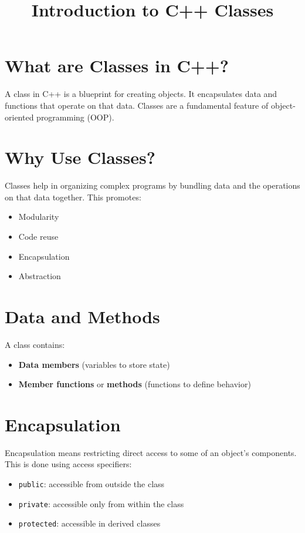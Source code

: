 \documentclass{article}
\title{Introduction to C++ Classes}
\author{}
\date{}
\begin{document}
\maketitle

\section{What are Classes in C++?}
A class in C++ is a blueprint for creating objects. It encapsulates data and functions that operate on that data. Classes are a fundamental feature of object-oriented programming (OOP).

\section{Why Use Classes?}
Classes help in organizing complex programs by bundling data and the operations on that data together. This promotes:
\begin{itemize}
  \item Modularity
  \item Code reuse
  \item Encapsulation
  \item Abstraction
\end{itemize}

\section{Data and Methods}
A class contains:
\begin{itemize}
  \item \textbf{Data members} (variables to store state)
  \item \textbf{Member functions} or \textbf{methods} (functions to define behavior)
\end{itemize}

\section{Encapsulation}
Encapsulation means restricting direct access to some of an object's components. This is done using access specifiers:
\begin{itemize}
  \item \texttt{public}: accessible from outside the class
  \item \texttt{private}: accessible only from within the class
  \item \texttt{protected}: accessible in derived classes
\end{itemize}
\end{document}
